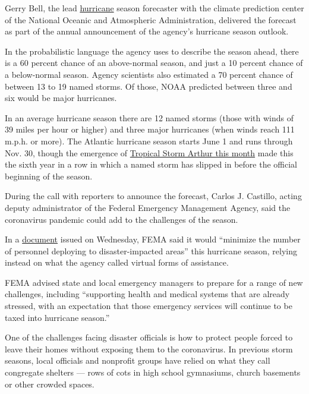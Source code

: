 Gerry Bell, the lead
\href{https://www.nytimes3xbfgragh.onion/2020/07/09/climate/trump-hurricane-dorian-noaa.html}{hurricane}
season forecaster with the climate prediction center of the National
Oceanic and Atmospheric Administration, delivered the forecast as part
of the annual announcement of the agency's hurricane season outlook.

In the probabilistic language the agency uses to describe the season
ahead, there is a 60 percent chance of an above-normal season, and just
a 10 percent chance of a below-normal season. Agency scientists also
estimated a 70 percent chance of between 13 to 19 named storms. Of
those, NOAA predicted between three and six would be major hurricanes.

In an average hurricane season there are 12 named storms (those with
winds of 39 miles per hour or higher) and three major hurricanes (when
winds reach 111 m.p.h. or more). The Atlantic hurricane season starts
June 1 and runs through Nov. 30, though the emergence of
\href{https://www.nytimes3xbfgragh.onion/2020/05/17/us/tropical-storm-arthur-2020-path.html}{Tropical
Storm Arthur this month} made this the sixth year in a row in which a
named storm has slipped in before the official beginning of the season.

During the call with reporters to announce the forecast, Carlos J.
Castillo, acting deputy administrator of the Federal Emergency
Management Agency, said the coronavirus pandemic could add to the
challenges of the season.

In a
\href{https://www.fema.gov/media-library-data/1589997234798-adb5ce5cb98a7a89e3e1800becf0eb65/2020_Hurricane_Pandemic_Plan.pdf}{document}
issued on Wednesday, FEMA said it would ``minimize the number of
personnel deploying to disaster-impacted areas'' this hurricane season,
relying instead on what the agency called virtual forms of assistance.

FEMA advised state and local emergency managers to prepare for a range
of new challenges, including ``supporting health and medical systems
that are already stressed, with an expectation that those emergency
services will continue to be taxed into hurricane season.''

One of the challenges facing disaster officials is how to protect people
forced to leave their homes without exposing them to the coronavirus. In
previous storm seasons, local officials and nonprofit groups have relied
on what they call congregate shelters --- rows of cots in high school
gymnasiums, church basements or other crowded spaces.

